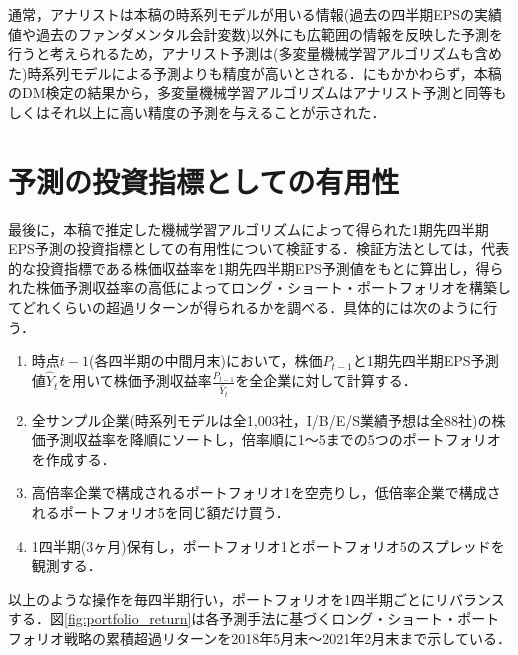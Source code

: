 \documentclass[a4paper，11pt]{jsarticle}
\begin{document}
通常，アナリストは本稿の時系列モデルが用いる情報(過去の四半期EPSの実績値や過去のファンダメンタル会計変数)以外にも広範囲の情報を反映した予測を行うと考えられるため\citep{sakurai1990}，アナリスト予測は(多変量機械学習アルゴリズムも含めた)時系列モデルによる予測よりも精度が高いとされる．にもかかわらず，本稿のDM検定の結果から，多変量機械学習アルゴリズムはアナリスト予測と同等もしくはそれ以上に高い精度の予測を与えることが示された．

\part{予測の投資指標としての有用性} \label{par:portfolio}

最後に，本稿で推定した機械学習アルゴリズムによって得られた1期先四半期EPS予測の投資指標としての有用性について検証する．検証方法としては，代表的な投資指標である株価収益率を1期先四半期EPS予測値をもとに算出し，得られた株価予測収益率の高低によってロング・ショート・ポートフォリオを構築してどれくらいの超過リターンが得られるかを調べる．具体的には次のように行う．

\begin{enumerate}
  \item 時点$t-1$(各四半期の中間月末)において，株価$P_{t-1}$と1期先四半期EPS予測値$\hat{Y}_t$を用いて株価予測収益率$\frac{P_{t-1}}{\hat{Y}_t}$を全企業に対して計算する．
  \item 全サンプル企業(時系列モデルは全1,003社，I/B/E/S業績予想は全88社)の株価予測収益率を降順にソートし，倍率順に1～5までの5つのポートフォリオを作成する．
  \item 高倍率企業で構成されるポートフォリオ1を空売りし，低倍率企業で構成されるポートフォリオ5を同じ額だけ買う．
  \item 1四半期(3ヶ月)保有し，ポートフォリオ1とポートフォリオ5のスプレッドを観測する．
\end{enumerate}

\noindent
以上のような操作を毎四半期行い，ポートフォリオを1四半期ごとにリバランスする．図\ref{fig:portfolio_return}は各予測手法に基づくロング・ショート・ポートフォリオ戦略の累積超過リターンを2018年5月末～2021年2月末まで示している．
\end{document}
